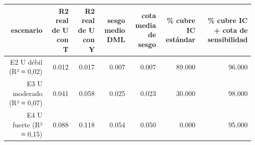 \begin{tabular}{rrrrrrr}
\toprule
escenario & R2 real de U con T & R2 real de U con Y & sesgo medio DML & cota media de sesgo & \% cubre IC estándar & \% cubre IC + cota de sensibilidad \\
\midrule
E2 U débil (R² ≈ 0,02) & 0.012 & 0.017 & 0.007 & 0.007 & 89.000 & 96.000 \\
E3 U moderado (R² ≈ 0,07) & 0.041 & 0.058 & 0.025 & 0.023 & 30.000 & 98.000 \\
E4 U fuerte (R² ≈ 0,15) & 0.088 & 0.118 & 0.054 & 0.050 & 0.000 & 95.000 \\
\bottomrule
\end{tabular}